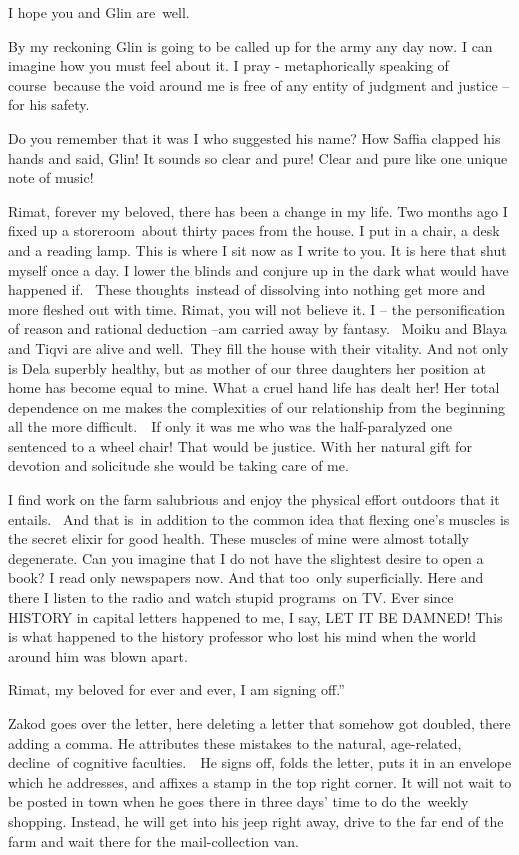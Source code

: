 \documentclass[twoside,11pt]{book}
\begin{document}
I hope you and Glin are~well.

By my reckoning Glin is going to be called up for the army any day now. I can imagine how you must feel about it. I pray
- metaphorically speaking of course~because the void around me is free of any entity of judgment and justice -- for his
safety.

Do you remember that it was I who suggested his name? How Saffia clapped his hands and said, {\textquotedbl}Glin! It
sounds so clear and pure! Clear and pure like one unique {note of music}!{\textquotedbl}

Rimat, forever my beloved, there has been a change in my life. Two months ago I fixed up a storeroom~about thirty paces
from the house. I put in a chair, a desk and a reading lamp. This is where I sit now as I write to you. It is here that
shut myself once a day. I lower the blinds and conjure up in the dark what would have happened
{\textquotedbl}if{\textquotedbl}.~ These thoughts~instead of dissolving into nothing get more and more fleshed out with
time. Rimat, you will not believe it. I -- the personification of reason and rational deduction --am carried away by
fantasy.~ Moiku and Blaya and Tiqvi are alive and well.\ They fill the house with their vitality. And not only is Dela
superbly healthy, but as mother of our three daughters her position at home has become equal to mine. What a cruel hand
life has dealt her! Her total dependence on me makes the complexities of our relationship from the beginning all the
more difficult.\ \ If only it was me who was the half-paralyzed one sentenced to a wheel chair! That would be justice.
With her natural gift for devotion and solicitude she would be taking care of me.~ 

I find work on the farm salubrious and enjoy the physical effort outdoors that it entails.~ And that is~in addition to
the common idea that flexing one's muscles is the secret elixir for good health. These muscles of mine were almost
totally degenerate. Can you imagine that I do not have the slightest desire to open a book? I read only newspapers now.
And that too\ only superficially. Here and there I listen to the radio and watch stupid programs~on TV. Ever since
HISTORY in capital letters happened to me, I say, LET IT BE DAMNED! This is what happened to the history professor who
lost his mind when the world around him was blown apart.

Rimat, my beloved for ever and ever, I am signing off.{}''

Zakod goes over the letter, here deleting a letter that somehow got doubled, there adding a comma. He attributes these
mistakes to the natural, age-related, decline~of cognitive faculties.\ \ He signs off, folds the letter, puts it in an
envelope which he addresses, and affixes a stamp in the top right corner. It will not wait to be posted in town when he
goes there in three days' time to do the~weekly shopping. Instead, he will get into his jeep right away, drive to the
far end of the farm and wait there for the mail-collection van.
\end{document}
